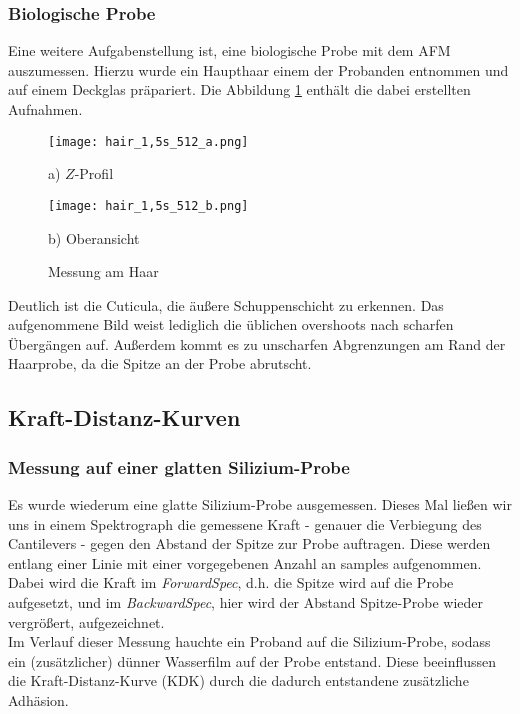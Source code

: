 \subsubsection{Biologische Probe}
Eine weitere Aufgabenstellung ist, eine biologische Probe mit dem AFM auszumessen. Hierzu wurde ein Haupthaar einem der Probanden entnommen und auf einem Deckglas präpariert. Die Abbildung \ref{fig:hair} enthält die dabei erstellten Aufnahmen.
\begin{figure}[h]
\centering
	\begin{minipage}{0.45\textwidth}
	\centering
		\texttt{[image: hair\_1,5s\_512\_a.png]}
		\caption*{a) $Z$-Profil}
	\end{minipage}
	\hfill
	\begin{minipage}{0.45\textwidth}
	\centering
		\texttt{[image: hair\_1,5s\_512\_b.png]}
		\caption*{b) Oberansicht}
	\end{minipage}
	\caption{Messung am Haar}
	\label{fig:hair}
\end{figure}
Deutlich ist die Cuticula, die äußere Schuppenschicht zu erkennen. Das aufgenommene Bild weist lediglich die üblichen overshoots nach scharfen Übergängen auf. Außerdem kommt es zu unscharfen Abgrenzungen am Rand der Haarprobe, da die Spitze an der Probe abrutscht.
\subsection{Kraft-Distanz-Kurven}
\subsubsection{Messung auf einer glatten Silizium-Probe}
Es wurde wiederum eine glatte Silizium-Probe ausgemessen. Dieses Mal ließen wir uns in einem Spektrograph die gemessene Kraft - genauer die Verbiegung des Cantilevers - gegen den Abstand der Spitze zur Probe auftragen. Diese werden entlang einer Linie mit einer vorgegebenen Anzahl an samples aufgenommen.\\
Dabei wird die Kraft im \emph{ForwardSpec}, d.h. die Spitze wird auf die Probe aufgesetzt, und im \emph{BackwardSpec}, hier wird der Abstand Spitze-Probe wieder vergrößert, aufgezeichnet.\\
Im Verlauf dieser Messung hauchte ein Proband auf die Silizium-Probe, sodass ein (zusätzlicher) dünner Wasserfilm auf der Probe entstand. Diese beeinflussen die Kraft-Distanz-Kurve (KDK) durch die dadurch entstandene zusätzliche Adhäsion.

